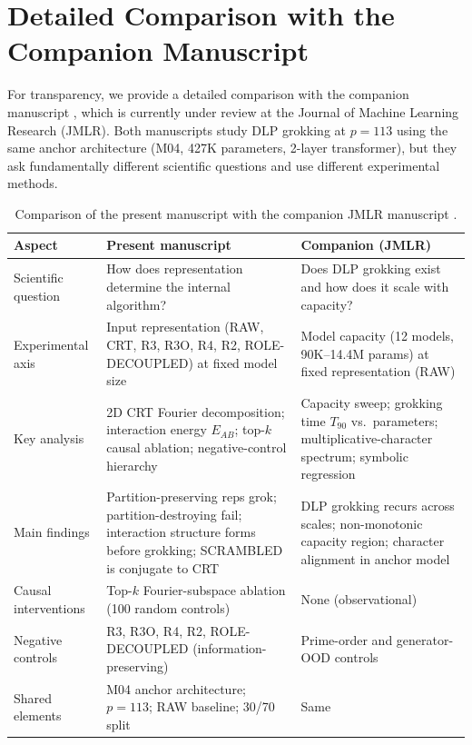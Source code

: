 \documentclass[11pt,a4paper]{article}
\theoremstyle{definition}
\theoremstyle{remark}
\begin{document}
\section{Detailed Comparison with the Companion Manuscript}
\label{sec:differences}

For transparency, we provide a detailed comparison with the companion manuscript \citep{vesterlund2026grokking}, which is currently under review at the Journal of Machine Learning Research (JMLR). Both manuscripts study DLP grokking at $p=113$ using the same anchor architecture (M04, 427K parameters, 2-layer transformer), but they ask fundamentally different scientific questions and use different experimental methods.

\begin{table}[h]
\centering
\caption{Comparison of the present manuscript with the companion JMLR manuscript \citep{vesterlund2026grokking}.}
\label{tab:differences}
\begin{tabular}{p{}p{}p{}}
\toprule
\textbf{Aspect} & \textbf{Present manuscript} & \textbf{Companion (JMLR)} \\
\midrule
Scientific question & How does representation determine the internal algorithm? & Does DLP grokking exist and how does it scale with capacity? \\
\addlinespace
Experimental axis & Input representation (RAW, CRT, R3, R3O, R4, R2, ROLE-DECOUPLED) at fixed model size & Model capacity (12 models, 90K--14.4M params) at fixed representation (RAW) \\
\addlinespace
Key analysis & 2D CRT Fourier decomposition; interaction energy $E_{AB}$; top-$k$ causal ablation; negative-control hierarchy & Capacity sweep; grokking time $T_{90}$ vs.\ parameters; multiplicative-character spectrum; symbolic regression \\
\addlinespace
Main findings & Partition-preserving reps grok; partition-destroying fail; interaction structure forms before grokking; SCRAMBLED is conjugate to CRT & DLP grokking recurs across scales; non-monotonic capacity region; character alignment in anchor model \\
\addlinespace
Causal interventions & Top-$k$ Fourier-subspace ablation (100 random controls) & None (observational) \\
\addlinespace
Negative controls & R3, R3O, R4, R2, ROLE-DECOUPLED (information-preserving) & Prime-order and generator-OOD controls \\
\addlinespace
Shared elements & M04 anchor architecture; $p=113$; RAW baseline; 30/70 split & Same \\
\bottomrule
\end{tabular}
\end{table}
\end{document}

